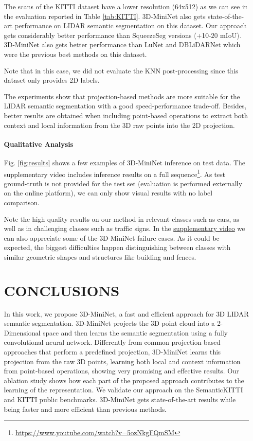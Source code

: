 \documentclass[letterpaper, 10 pt, journal, twoside]{IEEEtran}
\begin{document}
The scans of the KITTI dataset \cite{geiger2012wekitti} have a lower resolution (64x512) as we can see in the evaluation reported in Table \ref{tab:KITTI}.  
3D-MiniNet also gets state-of-the-art performance on LIDAR semantic segmentation on this dataset.
Our approach gets considerably better performance than SqueezeSeg versions (+10-20 mIoU). 
3D-MiniNet also gets better performance than LuNet and  DBLiDARNet which were the previous best methods on this dataset. 


Note that in this case, we did not evaluate the KNN post-processing since this dataset only provides 2D labels.  

The experiments show that projection-based methods are more suitable for the LIDAR semantic segmentation with a good speed-performance trade-off. Besides, better results are obtained when including point-based operations to extract both context and local information from the 3D raw points into the 2D projection. 


\paragraph{Qualitative Analysis} Fig. \ref{fig:results} shows a few examples of 3D-MiniNet inference on test data. 
The supplementary video includes inference results on a full sequence\footnote{\url{https://www.youtube.com/watch?v=5ozNkgFQmSM}}.
As test ground-truth is not provided for the test set (evaluation is performed externally on the online platform), we can only show visual results with no label comparison.  

Note the high quality results on our method in relevant classes such as cars, as well as in challenging classes such as traffic signs.
In the \href{https://www.youtube.com/watch?v=5ozNkgFQmSM}{supplementary video} we can also appreciate some of the 3D-MiniNet failure cases. As it could be expected, the biggest difficulties happen  distinguishing between classes with similar geometric shapes and structures like building and fences.
   
   

 
 
\section{CONCLUSIONS}

In this work, we propose 3D-MiniNet, a fast and efficient approach for 3D LIDAR semantic segmentation. 
3D-MiniNet projects the 3D point cloud into a 2-Dimensional space and then learns the semantic segmentation using a fully convolutional neural network.
Differently from common projection-based approaches that perform a predefined projection, 3D-MiniNet learns this projection from the raw 3D points, learning both local and context information from point-based operations, showing very promising and effective results. 
Our ablation study shows how each part of the proposed approach contributes to the learning of the representation. 
We validate our approach on the SemanticKITTI and KITTI public benchmarks. 3D-MiniNet gets state-of-the-art results while being faster and more efficient than previous methods. 


 
 

{


}
\end{document}
